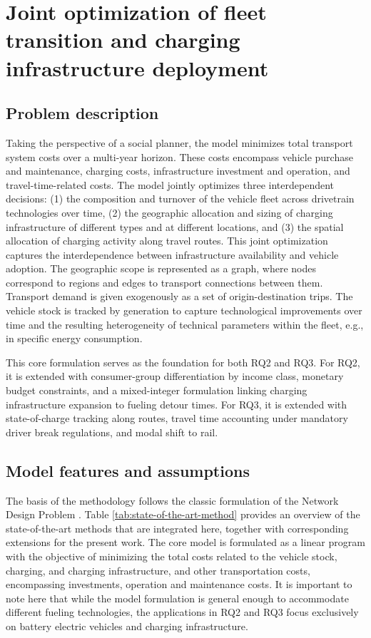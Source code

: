     \section{Joint optimization of fleet transition and charging infrastructure deployment}
    
    \subsection{Problem description}

    Taking the perspective of a social planner, the model minimizes total transport system costs over a multi-year horizon. These costs encompass vehicle purchase and maintenance, charging costs, infrastructure investment and operation, and travel-time-related costs. The model jointly optimizes three interdependent decisions: (1) the composition and turnover of the vehicle fleet across drivetrain technologies over time, (2) the geographic allocation and sizing of charging infrastructure of different types and at different locations, and (3) the spatial allocation of charging activity along travel routes. This joint optimization captures the interdependence between infrastructure availability and vehicle adoption. The geographic scope is represented as a graph, where nodes correspond to regions and edges to transport connections between them. Transport demand is given exogenously as a set of origin-destination trips. The vehicle stock is tracked by generation to capture technological improvements over time and the resulting heterogeneity of technical parameters within the fleet, e.g., in specific energy consumption.

    This core formulation serves as the foundation for both RQ2 and RQ3. For RQ2, it is extended with consumer-group differentiation by income class, monetary budget constraints, and a mixed-integer formulation linking charging infrastructure expansion to fueling detour times. For RQ3, it is extended with state-of-charge tracking along routes, travel time accounting under mandatory driver break regulations, and modal shift to rail.
    
    
    \subsection{Model features and assumptions}\label{sec:model_features}
        The basis of the methodology follows the classic formulation of the Network Design Problem \citep{Yang01071998}. Table \ref{tab:state-of-the-art-method} provides an overview of the state-of-the-art methods that are integrated here, together with corresponding extensions for the present work. The core model is formulated as a linear program with the objective of minimizing the total costs related to the vehicle stock, charging, and charging infrastructure, and other transportation costs, encompassing investments, operation and maintenance costs. It is important to note here that while the model formulation is general enough to accommodate different fueling technologies, the applications in RQ2 and RQ3 focus exclusively on battery electric vehicles and charging infrastructure.

